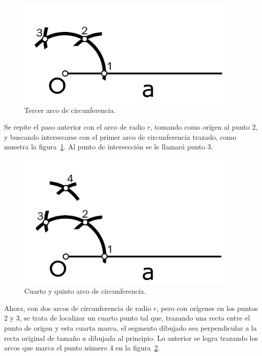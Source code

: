 \begin{figure}[H]
\centering
\includegraphics[width=0.95\textwidth]{Figures/Cuad4}
\caption[Tercer arco de circunferencia.]{Tercer arco de circunferencia.}
\label{fig:TrazFig4}
\end{figure}

Se repite el paso anterior con el arco de radio $r$, tomando como origen al punto 2, y buscando intersecarse con el primer arco de circunferencia trazado, como muestra la figura~\ref{fig:TrazFig4}. Al punto de intersección se le llamará punto 3.

\begin{figure}[H]
\centering
\includegraphics[width=0.95\textwidth]{Figures/Cuad5}
\caption[Cuarto y quinto arco de circunferencia.]{Cuarto y quinto arco de circunferencia.}
\label{fig:TrazFig5}
\end{figure}

Ahora, con dos arcos de circunferencia de radio $r$, pero con orígenes en los puntos 2 y 3, se trata de localizar un cuarto punto tal que, trazando una recta entre el punto de origen y esta cuarta marca, el segmento dibujado sea perpendicular a la recta original de tamaño $a$ dibujada al principio. Lo anterior se logra trazando los arcos que marca el punto número 4 en la figura~\ref{fig:TrazFig5}.

